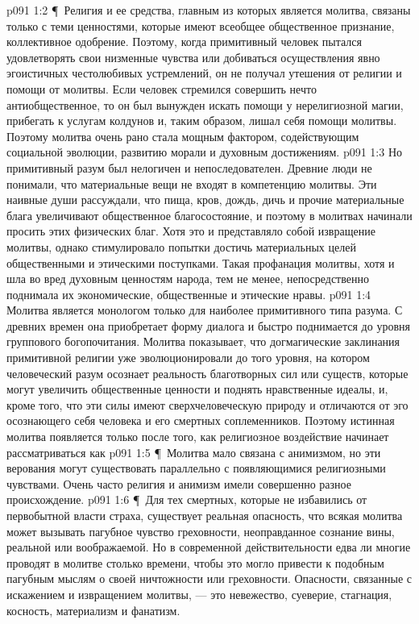 \vs p091 1:2 \P\ Религия и ее средства, главным из которых является молитва, связаны только с теми ценностями, которые имеют всеобщее общественное признание, коллективное одобрение. Поэтому, когда примитивный человек пытался удовлетворять свои низменные чувства или добиваться осуществления явно эгоистичных честолюбивых устремлений, он не получал утешения от религии и помощи от молитвы. Если человек стремился совершить нечто антиобщественное, то он был вынужден искать помощи у нерелигиозной магии, прибегать к услугам колдунов и, таким образом, лишал себя помощи молитвы. Поэтому молитва очень рано стала мощным фактором, содействующим социальной эволюции, развитию морали и духовным достижениям.
\vs p091 1:3 Но примитивный разум был нелогичен и непоследователен. Древние люди не понимали, что материальные вещи не входят в компетенцию молитвы. Эти наивные души рассуждали, что пища, кров, дождь, дичь и прочие материальные блага увеличивают общественное благосостояние, и поэтому в молитвах начинали просить этих физических благ. Хотя это и представляло собой извращение молитвы, однако стимулировало попытки достичь материальных целей общественными и этическими поступками. Такая профанация молитвы, хотя и шла во вред духовным ценностям народа, тем не менее, непосредственно поднимала их экономические, общественные и этические нравы.
\vs p091 1:4 Молитва является монологом только для наиболее примитивного типа разума. С древних времен она приобретает форму диалога и быстро поднимается до уровня группового богопочитания. Молитва показывает, что догмагические заклинания примитивной религии уже эволюционировали до того уровня, на котором человеческий разум осознает реальность благотворных сил или существ, которые могут увеличить общественные ценности и поднять нравственные идеалы, и, кроме того, что эти силы имеют сверхчеловеческую природу и отличаются от эго осознающего себя человека и его смертных соплеменников. Поэтому истинная молитва появляется только после того, как религиозное воздействие начинает рассматриваться как 
\vs p091 1:5 \P\ Молитва мало связана с анимизмом, но эти верования могут существовать параллельно с появляющимися религиозными чувствами. Очень часто религия и анимизм имели совершенно разное происхождение.
\vs p091 1:6 \P\ Для тех смертных, которые не избавились от первобытной власти страха, существует реальная опасность, что всякая молитва может вызывать пагубное чувство греховности, неоправданное сознание вины, реальной или воображаемой. Но в современной действительности едва ли многие проводят в молитве столько времени, чтобы это могло привести к подобным пагубным мыслям о своей ничтожности или греховности. Опасности, связанные с искажением и извращением молитвы, --- это невежество, суеверие, стагнация, косность, материализм и фанатизм.
